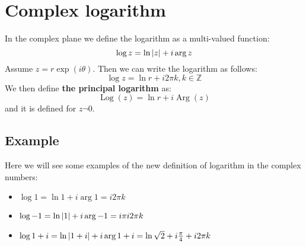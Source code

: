 \documentclass{article}
\def\Z{\mathbb{Z}}
\DeclarePairedDelimiter\abs{\lvert}{\rvert}%
\renewcommand{\exp}[1]{\operatorname{exp}\left(#1\right)}
\newcommand{\Log}[1]{\operatorname{Log}\left(#1\right)}
\newcommand{\Arg}[1]{\operatorname{Arg}\left(#1\right)}
\begin{document}
    \section{Complex logarithm}
    In the complex plane we define the logarithm as a multi-valued function:
    \begin{equation*}
        \log{z} = \ln{\abs{z}} + i\arg{z}
    \end{equation*}
     Assume $z = r\exp{i\theta}$. Then we can write the logarithm as follows:
     \begin{equation*}
        \log{z} = \ln{r} + i2\pi k, k\in \Z
     \end{equation*}
     We then define \textbf{the principal logarithm} as:
     \begin{equation*}
        \Log{z} = \ln{r} + i\Arg{z}
     \end{equation*}
     and it is defined for $z\neg 0$.
     \subsection{Example}
     Here we will see some examples of the new definition of logarithm in the complex numbers:
     \begin{itemize}
         \item $\log{1} = \ln{1} + i\arg{1} = i2\pi k$
         \item $\log{-1} = \ln{\abs{1}} + i\arg{-1} = i\pi i2\pi k$
         \item $\log{1+i} = \ln{\abs{1+i}} + i\arg{1+i} = \ln{\sqrt{2}} +i\frac{\pi}{4} + i2\pi k$
     \end{itemize}
\end{document}
